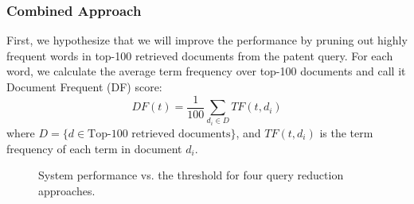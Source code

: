 \subsubsection{Combined Approach}
First, we hypothesize that we will improve the performance by pruning out highly frequent words in top-100 retrieved documents from the patent query. For each word, we calculate the average term frequency over top-100 documents and call it Document Frequent (DF) score:
\begin{equation}
 DF(t)=\frac{1}{100}\sum_{d_i\in  D} TF(t, d_i)    
 \label{eq:df}
\end{equation}
where $D=\{d\in \mbox{Top-100 retrieved documents}\}$, and $TF(t, d_i)$ is the term frequency of each term in document $d_i$.
\begin{figure}[t!]
\begin{centering}
 \hspace*{1.5cm}  
\par\end{centering} 
\protect\caption{System performance vs. the threshold for four query reduction approaches.}
\label{fig:combinedapproach}
\end{figure}
